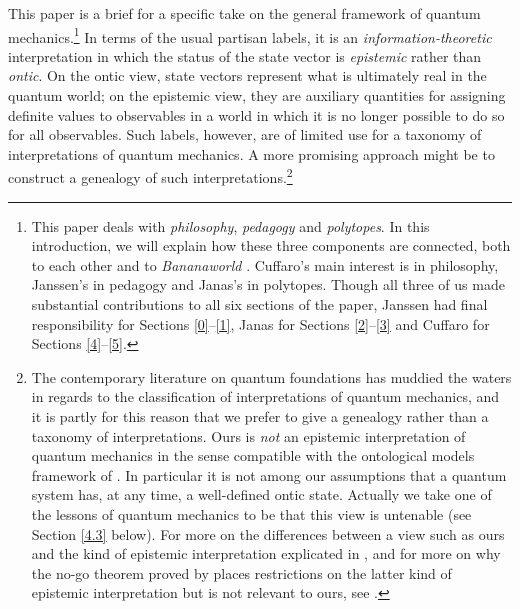 

This paper is a brief for a specific take on the general framework of quantum mechanics.\footnote{This paper deals with \emph{philosophy}, \emph{pedagogy} and \emph{polytopes}. In this introduction, we will explain how these three components are connected, both to each other and to \emph{Bananaworld} \citep{Bub 2016}. Cuffaro's main interest is in philosophy, Janssen's in pedagogy and Janas's in polytopes. Though all three of us made substantial contributions to all six sections of the paper, Janssen had final responsibility for Sections \ref{0}--\ref{1}, Janas for Sections \ref{2}--\ref{3} and Cuffaro for Sections \ref{4}--\ref{5}.} In terms of the usual partisan labels, it is an \emph{information-theoretic} interpretation in which the status of the state vector is \emph{epistemic} rather than \emph{ontic}. On the ontic view, state vectors represent what is ultimately real in the quantum world; on the epistemic view, they are auxiliary quantities for assigning definite values to observables in a world in which it is no longer possible to do so for all observables. Such labels, however, are of limited use for a taxonomy of interpretations of quantum mechanics. A more promising approach might be to construct a genealogy of such interpretations.\footnote{The contemporary literature on quantum foundations has muddied the waters in regards to the classification of interpretations of quantum mechanics, and it is partly for this reason that we prefer to give a genealogy rather than a taxonomy of interpretations. Ours is \emph{not} an epistemic interpretation of quantum mechanics in the sense compatible with the ontological models framework of \citet[]{Harrigan and Spekkens 2010}. In particular it is not among our assumptions that a quantum system has, at any time, a well-defined ontic state. Actually we take one of the lessons of quantum mechanics to be that this view is untenable (see Section \ref{4.3} below). For more on the differences between a view such as ours and the kind of epistemic interpretation explicated in \citet[]{Harrigan and Spekkens 2010}, and for more on why the no-go theorem proved by \citet{PBR} places restrictions on the latter kind of epistemic interpretation but is not relevant to ours, see \citet[]{Ben-Menahem 2017}.}
